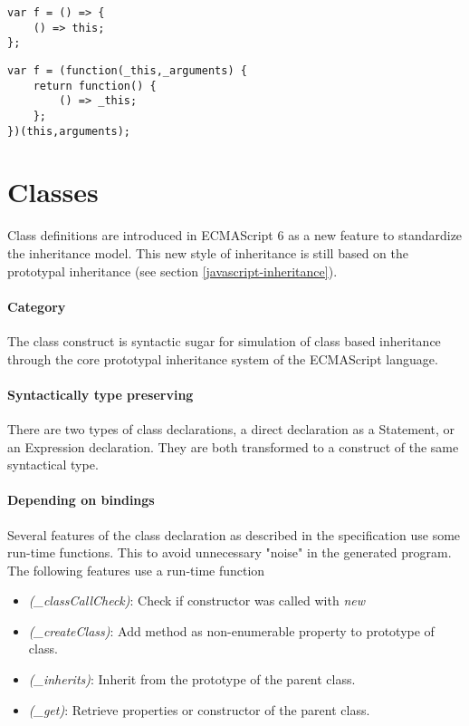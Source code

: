 \begin{lstlisting}
var f = () => {
	() => this;
};
\end{lstlisting}

\begin{lstlisting}[caption={Incorrect renaming of this in nested arrow function}]
var f = (function(_this,_arguments) {
	return function() {	
		() => _this;
	};
})(this,arguments);
\end{lstlisting}

\section{Classes}
Class definitions\cite[14.5]{SpecJS} are introduced in ECMAScript 6 as a new feature to standardize the inheritance model. 
This new style of inheritance is still based on the prototypal inheritance (see section \ref{javascript-inheritance}).

\paragraph{Category}
The class construct is syntactic sugar for simulation of class based inheritance through the core prototypal inheritance system of the ECMAScript language.

\paragraph{Syntactically type preserving}
There are two types of class declarations, a direct declaration as a Statement, or an Expression declaration. They are both transformed to a construct of the same syntactical type.

\paragraph{Depending on bindings}
Several features of the class declaration as described in the specification use some run-time functions. This to avoid unnecessary "noise" in the generated program. The following features use a run-time function

\begin{itemize}
	\item \textit{(\_classCallCheck)}: Check if constructor was called with \textit{new} 
	\item \textit{(\_createClass)}: Add method as non-enumerable property to prototype of class. 
	\item \textit{(\_inherits)}: Inherit from the prototype of the parent class. 
	\item \textit{(\_get)}: Retrieve properties or constructor of the parent class.
\end{itemize}

